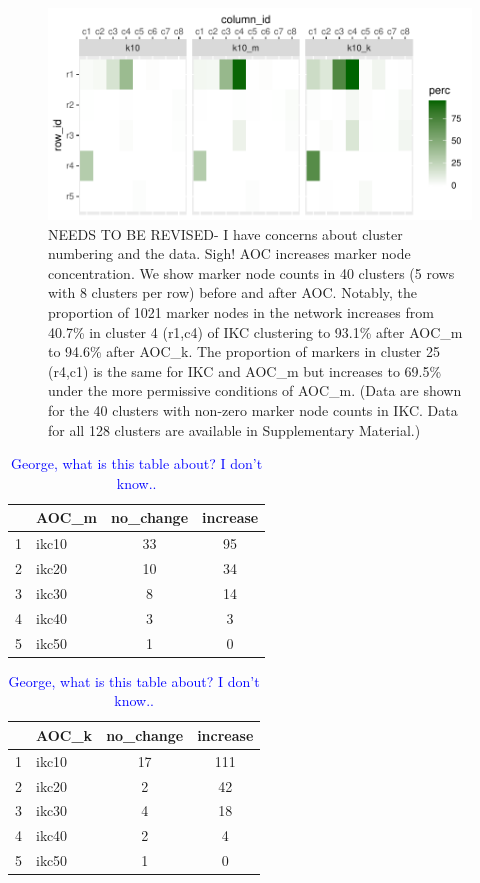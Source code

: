 \documentclass[12pt, oneside]{article}   	%
\begin{document}
\begin{figure}[H]
	\centering
	 \includegraphics[width=0.7\linewidth]{marker_comps_wide.pdf} 
\caption{NEEDS TO BE REVISED- I have concerns about cluster numbering and the data. Sigh! AOC increases marker node concentration. We show marker node counts in 40 clusters (5 rows with 8 clusters per row) before and after AOC.  Notably, the proportion of 1021 marker nodes in the network increases from 40.7\% in cluster 4 (r1,c4) of IKC clustering to 93.1\% after AOC\_m to 94.6\% after AOC\_k. The proportion of markers in cluster 25 (r4,c1) is the same for IKC and AOC\_m but increases to  69.5\% under the more permissive conditions of AOC\_m. (Data are shown for the 40 clusters with non-zero marker node counts in IKC. Data for all 128 clusters are available in Supplementary Material.)}
\label{fig:marker-node-concentration}
\end{figure}

\clearpage
\begin{table}[H]
\centering
\begin{tabular}{rlcc}
  \hline
 & AOC\_m & no\_change & increase \\ 
  \hline
1 & ikc10 &  33 &  95 \\ 
2 & ikc20 &  10 &  34 \\ 
3 & ikc30 &   8 &  14 \\ 
4 & ikc40 &   3 &   3 \\ 
5 & ikc50 &   1 &   0 \\ 
   \hline
\end{tabular}
\quad
\begin{tabular}{rlcc}
  \hline
 & AOC\_k& no\_change & increase \\ 
  \hline
1 & ikc10 &  17 & 111 \\ 
2 & ikc20 &   2 &  42 \\ 
3 & ikc30 &   4 &  18 \\ 
4 & ikc40 &   2 &   4 \\ 
5 & ikc50 &   1 &   0 \\ 
   \hline
\end{tabular}
\caption{\textcolor{blue}{George, what is this table about? I don't know..}}
\label{tab:tab-unknown}
\end{table}
\end{document}
